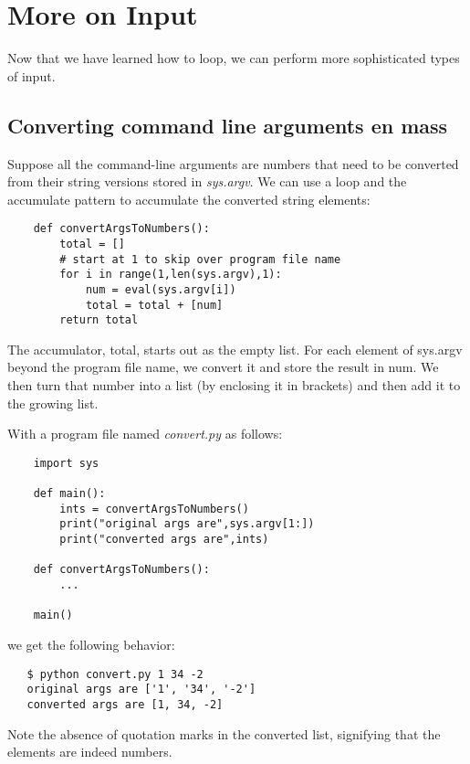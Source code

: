 \chapter{More on Input}
\label{MoreOnInput}

Now that we have learned how to loop, we can perform
more sophisticated types of input.

\section{Converting command line arguments en mass}

Suppose all the command-line arguments are numbers that
need to be converted from their string versions stored
in {\it sys.argv}.
We can use a loop and the accumulate pattern to accumulate
the converted string elements:

\begin{verbatim}
    def convertArgsToNumbers():
        total = []
        # start at 1 to skip over program file name
        for i in range(1,len(sys.argv),1):
            num = eval(sys.argv[i])
            total = total + [num]
        return total
\end{verbatim}

The accumulator, total, starts out as the empty list. For each
element of sys.argv beyond the program file name, we convert
it and store the result in num. We then turn that number
into a list (by enclosing it in brackets) and then add it
to the growing list.

With a program file named {\it convert.py} as follows:

\begin{verbatim}
    import sys

    def main():
        ints = convertArgsToNumbers()
        print("original args are",sys.argv[1:])
        print("converted args are",ints)

    def convertArgsToNumbers():
        ...

    main()
\end{verbatim}

we get the following behavior:

\begin{verbatim}
   $ python convert.py 1 34 -2
   original args are ['1', '34', '-2']
   converted args are [1, 34, -2]
\end{verbatim}

Note the absence of quotation marks in the converted list,
signifying that the elements are indeed numbers.

